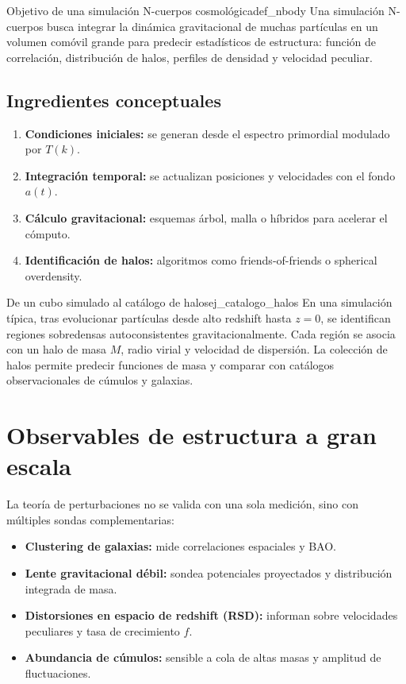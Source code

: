 \begin{definicion}{Objetivo de una simulación N-cuerpos cosmológica}{def_nbody}
Una simulación N-cuerpos busca integrar la dinámica gravitacional de muchas partículas en un volumen comóvil grande para predecir estadísticos de estructura: función de correlación, distribución de halos, perfiles de densidad y velocidad peculiar.
\end{definicion}

\subsection{Ingredientes conceptuales}

\begin{enumerate}[leftmargin=2em, label=\textbf{\arabic*.}]
  \item \textbf{Condiciones iniciales:} se generan desde el espectro primordial modulado por $T(k)$.
  \item \textbf{Integración temporal:} se actualizan posiciones y velocidades con el fondo $a(t)$.
  \item \textbf{Cálculo gravitacional:} esquemas árbol, malla o híbridos para acelerar el cómputo.
  \item \textbf{Identificación de halos:} algoritmos como friends-of-friends o spherical overdensity.
\end{enumerate}

\begin{ejemplo}{De un cubo simulado al catálogo de halos}{ej_catalogo_halos}
En una simulación típica, tras evolucionar partículas desde alto redshift hasta $z=0$, se identifican regiones sobredensas autoconsistentes gravitacionalmente. Cada región se asocia con un halo de masa $M$, radio virial y velocidad de dispersión. La colección de halos permite predecir funciones de masa y comparar con catálogos observacionales de cúmulos y galaxias.
\end{ejemplo}

\section{Observables de estructura a gran escala}
\label{sec:observables_lss}

La teoría de perturbaciones no se valida con una sola medición, sino con múltiples sondas complementarias:

\begin{itemize}[leftmargin=2em]
  \item \textbf{Clustering de galaxias:} mide correlaciones espaciales y BAO.
  \item \textbf{Lente gravitacional débil:} sondea potenciales proyectados y distribución integrada de masa.
  \item \textbf{Distorsiones en espacio de redshift (RSD):} informan sobre velocidades peculiares y tasa de crecimiento $f$.
  \item \textbf{Abundancia de cúmulos:} sensible a cola de altas masas y amplitud de fluctuaciones.
\end{itemize}

